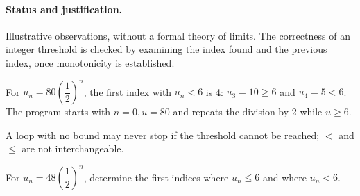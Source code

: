 \paragraph{Status and justification.} Illustrative observations, without a formal theory of limits. The correctness of an integer threshold is checked by examining the index found and the previous index, once monotonicity is established.
\begin{example}For $u_n=80(\dfrac{1}{2})^n$, the first index with $u_n<6$ is 4: $u_3=10\geq6$ and $u_4=5<6$. The program starts with $n=0,u=80$ and repeats the division by 2 while $u\geq6$.\end{example}\label{C01-EX5}
\begin{pitfall}A loop with no bound may never stop if the threshold cannot be reached; $<$ and $\leq$ are not interchangeable.\end{pitfall}
\begin{application}For $u_n=48(\dfrac{1}{2})^n$, determine the first indices where $u_n\leq6$ and where $u_n<6$.\end{application}\label{C01-AP5}
\mxnewpage
